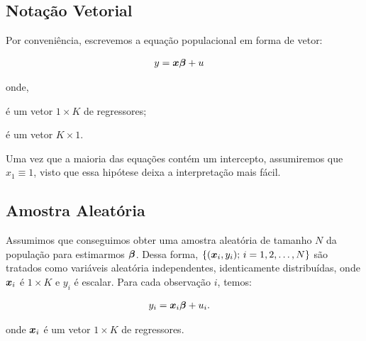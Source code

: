 \documentclass[11pt, oneside, a4paper, article]{article}
\numberwithin{equation}{section}
\begin{document}
\subsection*{Notação Vetorial} 
\noindent
\citet[Sec. 4.2 -- Asymptotic Properties of OLS; p.51]{wool-2010}

Por conveniência, escrevemos a equação populacional em forma de vetor:

\vspace{-1 em}
\begin{align} \label{ols:mod:vec}
	y &= \boldsymbol{x} \boldsymbol{\beta} + u
\end{align}

\noindent
onde,

\vspace{-1 em}
\begin{description}[noitemsep]
\item [$\mbs{x} \equiv (x_{1}, \dots, x_{K})$] é um vetor $1 \times K$ de regressores;

\item [$\mbs{\beta} \equiv (\beta_{1}, \dots, \beta_{K})'$] é um vetor $K \times 1$.
\end{description}

\noindent
Uma vez que a maioria das equações contém um intercepto, assumiremos que $x_{1} \equiv 1$, visto que essa hipótese deixa a interpretação mais fácil.

\subsection*{Amostra Aleatória} 

Assumimos que conseguimos obter uma amostra aleatória de tamanho $N$ da população para estimarmos $\boldsymbol{\beta}$.
Dessa forma, $\{ (\boldsymbol{x}_{i}, y_{i}); \, i = 1, 2, \dots, N \}$
são tratados como variáveis aleatória independentes, identicamente distribuídas, onde
$\boldsymbol{x}_{i}$ é $1 \times K$ e $y_{i}$ é escalar.
Para cada observação $i$, temos:

\vspace{-1 em}
\begin{align} \label{ols:mod:vec:i}
	y_{i} &= \boldsymbol{x}_{i} \boldsymbol{\beta} + u_{i}.
\end{align}

\noindent
onde
$\boldsymbol{x}_{i}$
é um vetor $1 \times K$ de regressores.
\end{document}
